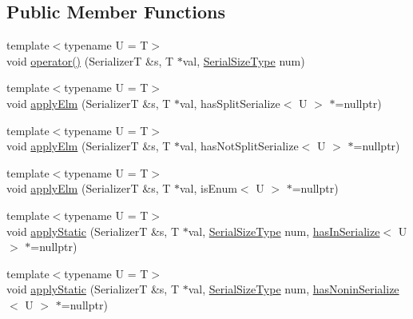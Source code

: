 \subsection*{Public Member Functions}
\begin{DoxyCompactItemize}
\item 
{\footnotesize template$<$typename U  = T$>$ }\\void \hyperlink{structcheckpoint_1_1dispatch_1_1_serializer_dispatch_non_byte_a6cf01feb8acb29ef56c37d3180b63671}{operator()} (SerializerT \&s, T $\ast$val, \hyperlink{namespacecheckpoint_a083f6674da3f94c2901b18c6d238217c}{Serial\+Size\+Type} num)
\item 
{\footnotesize template$<$typename U  = T$>$ }\\void \hyperlink{structcheckpoint_1_1dispatch_1_1_serializer_dispatch_non_byte_a3bbb12db16d00e1c76e51b52452187aa}{apply\+Elm} (SerializerT \&s, T $\ast$val, has\+Split\+Serialize$<$ U $>$ $\ast$=nullptr)
\item 
{\footnotesize template$<$typename U  = T$>$ }\\void \hyperlink{structcheckpoint_1_1dispatch_1_1_serializer_dispatch_non_byte_a88fe1c00864f170cd59deb25a2bf2695}{apply\+Elm} (SerializerT \&s, T $\ast$val, has\+Not\+Split\+Serialize$<$ U $>$ $\ast$=nullptr)
\item 
{\footnotesize template$<$typename U  = T$>$ }\\void \hyperlink{structcheckpoint_1_1dispatch_1_1_serializer_dispatch_non_byte_a7cd7decd9c65f3f5d68a2e593275f8d1}{apply\+Elm} (SerializerT \&s, T $\ast$val, is\+Enum$<$ U $>$ $\ast$=nullptr)
\item 
{\footnotesize template$<$typename U  = T$>$ }\\void \hyperlink{structcheckpoint_1_1dispatch_1_1_serializer_dispatch_non_byte_a5c76cadd528c3d2348a3963d44402aea}{apply\+Static} (SerializerT \&s, T $\ast$val, \hyperlink{namespacecheckpoint_a083f6674da3f94c2901b18c6d238217c}{Serial\+Size\+Type} num, \hyperlink{structcheckpoint_1_1dispatch_1_1_serializer_dispatch_non_byte_a7f2203710503e6ea7a5c4a565795a1d0}{has\+In\+Serialize}$<$ U $>$ $\ast$=nullptr)
\item 
{\footnotesize template$<$typename U  = T$>$ }\\void \hyperlink{structcheckpoint_1_1dispatch_1_1_serializer_dispatch_non_byte_a1bdb0ab1fae98f7c72d5770d0803494b}{apply\+Static} (SerializerT \&s, T $\ast$val, \hyperlink{namespacecheckpoint_a083f6674da3f94c2901b18c6d238217c}{Serial\+Size\+Type} num, \hyperlink{structcheckpoint_1_1dispatch_1_1_serializer_dispatch_non_byte_ad59e5c933a762ce90d1ab5f7ca04ca9f}{has\+Nonin\+Serialize}$<$ U $>$ $\ast$=nullptr)

\end{DoxyCompactItemize}
